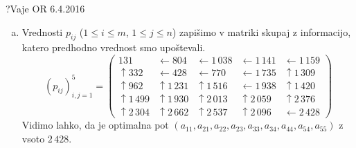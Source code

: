 \begin{naloga}{?}{Vaje OR 6.4.2016}
\begin{odgovor}
\begin{enumerate}[(a)]
\item Vrednosti $p_{ij}$ ($1 \le i \le m$, $1 \le j \le n$)
zapišimo v matriki skupaj z informacijo,
katero predhodno vrednost smo upoštevali.
$$
\left(p_{ij}\right)_{i,j=1}^5 = \left(\begin{array}{rrrrr}
            131 & \gets       804 & \gets    1\,038 &
\gets    1\,141 & \gets    1\,159 \\
\uparrow    332 & \gets       428 & \gets       770 &
\gets    1\,735 & \uparrow 1\,309 \\
\uparrow    962 & \uparrow 1\,231 & \uparrow 1\,516 &
\gets    1\,938 & \uparrow 1\,420 \\
\uparrow 1\,499 & \uparrow 1\,930 & \uparrow 2\,013 &
\uparrow 2\,059 & \uparrow 2\,376 \\
\uparrow 2\,304 & \uparrow 2\,662 & \uparrow 2\,537 &
\uparrow 2\,096 & \gets    2\,428
\end{array}\right)
$$
Vidimo lahko, da je optimalna pot
$(a_{11}, a_{21}, a_{22}, a_{23}, a_{33}, a_{34}, a_{44}, a_{54}, a_{55})$
z vsoto $2\,428$.


\end{enumerate}
\end{odgovor}
\end{naloga}
